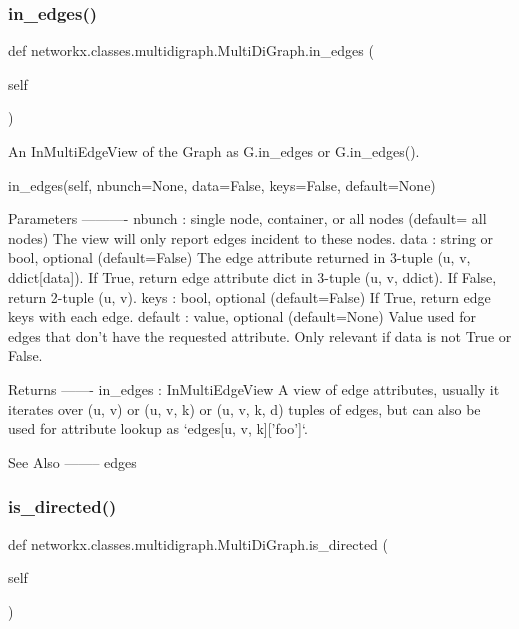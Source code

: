 \subsubsection{\texorpdfstring{in\+\_\+edges()}{in\_edges()}}
{\footnotesize\ttfamily def networkx.\+classes.\+multidigraph.\+Multi\+Di\+Graph.\+in\+\_\+edges (\begin{DoxyParamCaption}\item[{}]{self }\end{DoxyParamCaption})}

\begin{DoxyVerb}An InMultiEdgeView of the Graph as G.in_edges or G.in_edges().

in_edges(self, nbunch=None, data=False, keys=False, default=None)

Parameters
----------
nbunch : single node, container, or all nodes (default= all nodes)
    The view will only report edges incident to these nodes.
data : string or bool, optional (default=False)
    The edge attribute returned in 3-tuple (u, v, ddict[data]).
    If True, return edge attribute dict in 3-tuple (u, v, ddict).
    If False, return 2-tuple (u, v).
keys : bool, optional (default=False)
    If True, return edge keys with each edge.
default : value, optional (default=None)
    Value used for edges that don't have the requested attribute.
    Only relevant if data is not True or False.

Returns
-------
in_edges : InMultiEdgeView
    A view of edge attributes, usually it iterates over (u, v)
    or (u, v, k) or (u, v, k, d) tuples of edges, but can also be
    used for attribute lookup as `edges[u, v, k]['foo']`.

See Also
--------
edges
\end{DoxyVerb}
 \mbox{\label{classnetworkx_1_1classes_1_1multidigraph_1_1MultiDiGraph_a68a4d9c9228d427c4b2c2cb96090b14c}} 
\subsubsection{\texorpdfstring{is\+\_\+directed()}{is\_directed()}}
{\footnotesize\ttfamily def networkx.\+classes.\+multidigraph.\+Multi\+Di\+Graph.\+is\+\_\+directed (\begin{DoxyParamCaption}\item[{}]{self }\end{DoxyParamCaption})}

